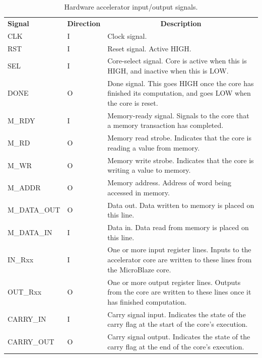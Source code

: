 \documentclass{UoYCSproject}
\begin{document}
\begin{table}[H]
\centering
\begin{tabular}{ |p{3cm}|p{2cm}|p{8cm}| }
\textbf{Signal} & \textbf{Direction} & \multicolumn{1}{c}{\textbf{Description}} \\
CLK             & I                  & Clock signal. \\[0.05cm]
RST             & I                  & Reset signal. Active HIGH. \\[0.05cm]
SEL             & I                  & Core-select signal. Core is active when this is HIGH, and inactive when this is LOW. \\[0.05cm]
DONE            & O                  & Done signal. This goes HIGH once the core has finished its computation, and goes LOW when the core is reset. \\[0.05cm]
M\_RDY          & I                  & Memory-ready signal. Signals to the core that a memory transaction has completed. \\[0.05cm]
M\_RD           & O                  & Memory read strobe. Indicates that the core is reading a value from memory. \\[0.05cm]
M\_WR           & O                  & Memory write strobe. Indicates that the core is writing a value to memory. \\[0.05cm]
M\_ADDR         & O                  & Memory address. Address of word being accessed in memory. \\[0.05cm]
M\_DATA\_OUT    & O                  & Data out. Data written to memory is placed on this line. \\[0.05cm]
M\_DATA\_IN     & I                  & Data in. Data read from memory is placed on this line. \\[0.05cm]
IN\_Rxx         & I                  & One or more input register lines. Inputs to the accelerator core are written to these lines from the MicroBlaze core. \\[0.05cm]
OUT\_Rxx        & O                  & One or more output register lines. Outputs from the core are written to these lines once it has finished computation. \\[0.05cm]
CARRY\_IN       & I                  & Carry signal input. Indicates the state of the carry flag at the start of the core's execution. \\[0.05cm]
CARRY\_OUT      & O                  & Carry signal output. Indicates the state of the carry flag at the end of the core's execution.
\end{tabular}
\caption{Hardware accelerator input/output signals.}
\label{table:acceleratorSignals}
\end{table}
\end{document}
